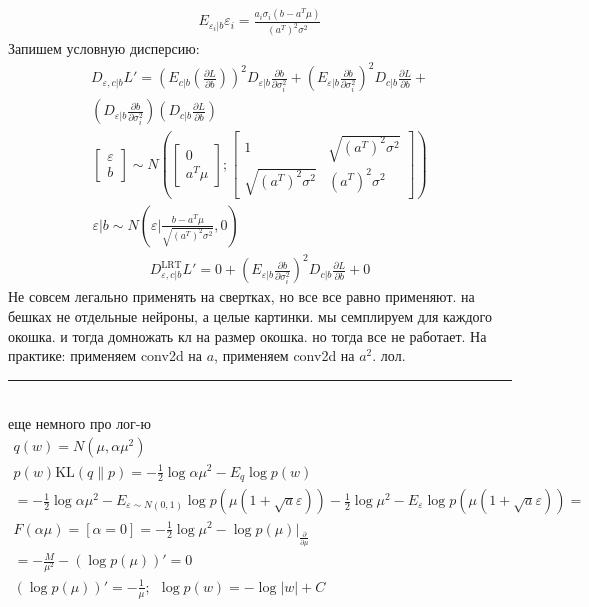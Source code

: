 \documentclass{minimal}
\begin{document}
\begin{gather*}
  E_{\varepsilon_i|b}\varepsilon_i=\frac{a_i\sigma_i(b-a^T\mu)}{(a^T)^2\sigma^2}
\end{gather*}
Запишем условную дисперсию:
\begin{gather*}
  D_{\varepsilon,c|b}L'=\left(E_{c|b} \left(\frac{\partial L}{\partial b}\right)\right)^2 D_{\varepsilon|b} \frac{\partial b}{\partial \sigma_i^2}+
  \left(E_{\varepsilon|b}\frac{\partial b}{\partial \sigma_i^2}\right)^2
  D_{c|b}\frac{\partial L}{\partial b}+\\
  \left(D_{\varepsilon|b}\frac{\partial b}{\partial \sigma_i^2}\right)
  \left(D_{c|b}\frac{\partial L}{\partial b}\right)
\end{gather*}
\begin{gather*}
  \begin{bmatrix}
    \varepsilon\\b
  \end{bmatrix}\sim N(
  \begin{bmatrix}
    0\\a^T\mu
  \end{bmatrix};
  \begin{bmatrix}
    1&\sqrt{(a^T)^2\sigma^2}\\
    \sqrt{(a^T)^2\sigma^2}&(a^T)^2\sigma^2
  \end{bmatrix})\\
  \varepsilon|b\sim N\left(\varepsilon\bigg|\frac{b-a^T\mu}{\sqrt{(a^T)^2\sigma^2}}, 0\right)
\end{gather*}
\begin{gather*}
  D^{\mathrm{LRT}}_{\varepsilon,c|b}L'=
  0+\left(E_{\varepsilon|b}\frac{\partial b}{\partial \sigma_i^2}\right)^2
  D_{c|b}\frac{\partial L}{\partial b} + 0
\end{gather*}
Не совсем легально применять на свертках, но все все равно применяют. на бешках не отдельные нейроны, а целые картинки. мы семплируем для каждого окошка. и тогда домножать кл на размер окошка. но тогда все не работает. На практике: применяем conv2d на $a$, применяем conv2d на $a^2$. лол.
\\
\hrule
~\\еще немного про лог-ю
\begin{gather*}
  q(w)=N(\mu,\alpha\mu^2)\\
  p(w)
  \mathrm{KL}(q\|p)=-\frac{1}{2}\log \alpha\mu^2 -E_q \log p(w)\\
  =-\frac{1}{2}\log \alpha\mu^2-E_{\varepsilon \sim N(0, 1)}\log p(\mu(1+\sqrt{a}\varepsilon))-\frac{1}{2}\log \mu^2-
  E_{\varepsilon}\log p(\mu(1+\sqrt{a}\varepsilon))=\\
F(\alpha\mu)=[\alpha=0]= -\frac{1}{2}\log \mu^2-\log p(\mu) \bigg\rvert_{\frac{\partial }{\partial \mu}}\\
=-\frac{M}{\mu^2}-(\log p(\mu))'=0\\
(\log p(\mu))'=-\frac{1}{\mu};~~\log p(w)=-\log|w|+C
\end{gather*}
\end{document}
